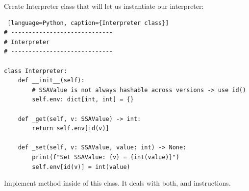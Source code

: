 \documentclass[../main.tex]{subfiles}
\begin{document}
Create Interpreter class that will let us instantiate our interpreter:
\begin{lstlisting} [language=Python, caption={Interpreter class}]
# -----------------------------
# Interpreter
# -----------------------------

class Interpreter:
    def __init__(self):
        # SSAValue is not always hashable across versions -> use id()
        self.env: dict[int, int] = {}

    def _get(self, v: SSAValue) -> int:
        return self.env[id(v)]

    def _set(self, v: SSAValue, value: int) -> None:
        print(f"Set SSAValue: {v} = {int(value)}")
        self.env[id(v)] = int(value)

\end{lstlisting}
Implement  method inside of this class. It deals with both,  and  instructions. 
\end{document}
